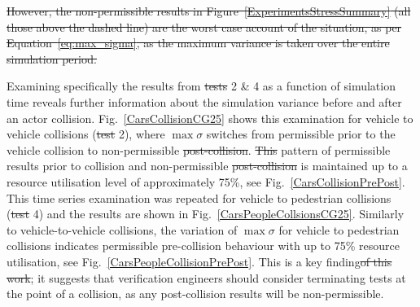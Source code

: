\documentclass[letterpaper, 10 pt, journal, twoside]{IEEEtran}
\providecommand{\DIFaddtex}[1]{{\protect\color{blue}\uwave{#1}}} %
\providecommand{\DIFdeltex}[1]{{\protect\color{red}\sout{#1}}}                      %
\providecommand{\DIFaddbegin}{} %
\providecommand{\DIFaddend}{} %
\providecommand{\DIFdelbegin}{} %
\providecommand{\DIFdelend}{} %
\providecommand{\DIFadd}[1]{\texorpdfstring{\DIFaddtex{#1}}{#1}} %
\providecommand{\DIFdel}[1]{\texorpdfstring{\DIFdeltex{#1}}{}} %
\begin{document}
\DIFdel{However, the non-permissible results in Figure~\ref{ExperimentsStressSummary} (all those above the dashed line) are the worst case account of the situation, as per Equation~\ref{eq:max_sigma}, as the maximum variance is taken over the entire simulation period.
}%

\DIFdelend Examining specifically the results from \DIFdelbegin \DIFdel{tests }\DIFdelend \DIFaddbegin \DIFadd{Tests }\DIFaddend 2 \& 4 as a function of simulation time reveals further information about the simulation variance before and after an actor collision. Fig.~\ref{CarsCollisionCG25} shows this examination for vehicle to vehicle collisions (\DIFdelbegin \DIFdel{test }\DIFdelend \DIFaddbegin \DIFadd{Test }\DIFaddend 2), where $\max\sigma$ switches from permissible prior to the vehicle collision to non-permissible \DIFdelbegin \DIFdel{post-collision}\DIFdelend \DIFaddbegin \DIFadd{post collision}\DIFaddend . 
%
\DIFdelbegin \DIFdel{This }\DIFdelend \DIFaddbegin \DIFadd{The }\DIFaddend pattern of permissible results prior to collision and non-permissible \DIFdelbegin \DIFdel{post-collision }\DIFdelend \DIFaddbegin \DIFadd{post collision }\DIFaddend is maintained up to a resource utilisation level of approximately 75\%, see Fig.~\ref{CarsCollisionPrePost}. This time series examination was repeated for vehicle to pedestrian collisions (\DIFdelbegin \DIFdel{test }\DIFdelend \DIFaddbegin \DIFadd{Test }\DIFaddend 4) and the results are shown in Fig.~\ref{CarsPeopleCollsionsCG25}. Similarly to vehicle-to-vehicle collisions, the variation of $\max\sigma$ for vehicle to pedestrian collisions indicates permissible pre-collision behaviour with up to 75\% resource utilisation, see Fig.~\ref{CarsPeopleCollisionPrePost}. This is a key finding\DIFdelbegin \DIFdel{of this work}\DIFdelend ; it suggests that verification engineers should consider terminating tests at the point of a collision, as any post-collision results will be non-permissible.
\DIFaddbegin 

\DIFaddend {}
\end{document}
